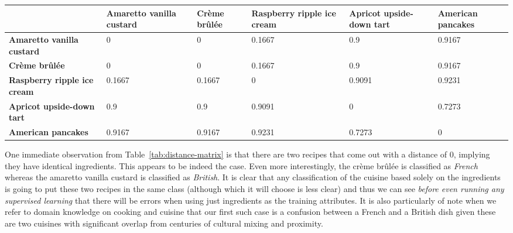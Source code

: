\documentclass[11pt,a4paper]{article}
\begin{document}
\begin{sidewaystable}
  \centering
  \begin{tabular}{| p{6cm} | p{2.5cm} | p{2.5cm} | p{2.5cm} | p{2.5cm} | p{2.5cm} |}
    \hline
                               & \textbf{Amaretto vanilla custard} & \textbf{Cr\`eme br\^ul\'ee} & \textbf{Raspberry ripple ice cream} & \textbf{Apricot upside-down tart} & \textbf{American pancakes} \\
    \hline
    \textbf{Amaretto vanilla custard}   & 0                        & 0                  & 0.1667                     & 0.9                      & 0.9167            \\
    \hline
    \textbf{Cr\`eme br\^ul\'ee}         & 0                        & 0                  & 0.1667                     & 0.9                      & 0.9167            \\
    \hline
    \textbf{Raspberry ripple ice cream} & 0.1667                   & 0.1667             & 0                          & 0.9091                   & 0.9231            \\
    \hline
    \textbf{Apricot upside-down tart}   & 0.9                      & 0.9                & 0.9091                     & 0                        & 0.7273            \\
    \hline
    \textbf{American pancakes}          & 0.9167                   & 0.9167             & 0.9231                     & 0.7273                   & 0                 \\
    \hline
  \end{tabular}
  \caption{Distance matrix between five dessert recipes}
  \label{tab:distance-matrix}
\end{sidewaystable}

One immediate observation from Table~\ref{tab:distance-matrix} is that there
are two recipes that come out with a distance of $0$, implying they have
identical ingredients. This appears to be indeed the case. Even more interestingly,
the cr\`eme br\^ul\'ee is classified as \emph{French} whereas the
amaretto vanilla custard is classified as \emph{British}. It is clear that any classification
of the cuisine based solely on the ingredients is going to put these two recipes in
the same class (although which it will choose is less clear) and thus we can see
\emph{before even running any supervised learning} that there will be errors when using
just ingredients as the training attributes. It is also particularly of note when
we refer to domain knowledge on
cooking and cuisine that our first such case is a confusion between a French and a British
dish given these are two cuisines with significant overlap from centuries of cultural mixing
and proximity.
\end{document}
